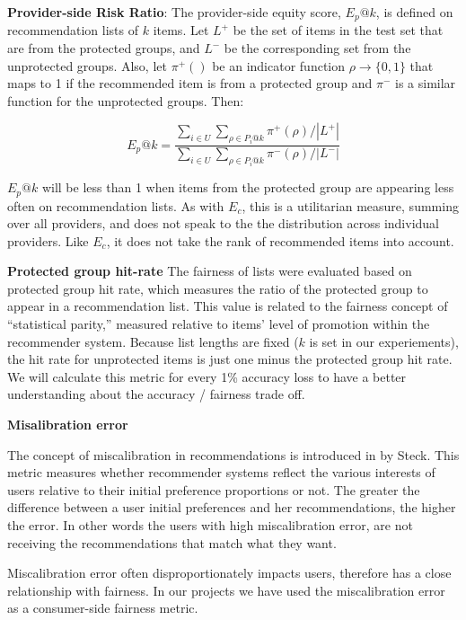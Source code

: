        
        \textbf{Provider-side Risk Ratio}: The provider-side equity score, $E_p@k$, is defined on recommendation lists of $k$ items. Let $L^+$ be the set of items in the test set that are from the protected groups, and $L^-$ be the corresponding set from the unprotected groups. Also, let $\pi^+()$ be an indicator function $\rho \rightarrow \{0,1\}$ that maps to 1 if the recommended item is from a protected group and $\pi^-$ is a similar function for the unprotected groups. Then:

        \begin{equation}
        E_p@k=\frac{\sum_{i \in U}{\sum_{\rho \in P_i@k}{\pi^+(\rho)}}/|L^+|}
        {\sum_{i \in U}{\sum_{\rho \in P_i@k}{\pi^-(\rho)}}/|L^-|}
        \end{equation}
        
        $E_p@k$ will be less than 1 when items from the protected group are appearing less often on recommendation lists. As with $E_c$, this is a utilitarian measure, summing over all providers, and does not speak to the the distribution across individual providers. Like $E_c$, it does not take the rank of recommended items into account.


        \textbf{Protected group hit-rate}
        The fairness of lists were evaluated based on protected group hit rate, which measures the ratio of the protected group to appear in a recommendation list. This value is related to the fairness concept of ``statistical parity,'' measured relative to items' level of promotion within the recommender system. Because list lengths are fixed ($k$ is set in our experiements), the hit rate for unprotected items is just one minus the protected group hit rate. We will calculate this metric for every 1\% accuracy loss to have a better understanding about the accuracy / fairness trade off.
        
    
        \textbf{Misalibration error}
        
        The concept of miscalibration in recommendations is introduced in \cite{steck2018calibrated} by Steck. This metric measures whether recommender systems reflect the various interests of users relative to their initial preference proportions or not. The greater the difference between a user initial preferences and her recommendations, the higher the error. In other words the users with high miscalibration error, are not receiving the recommendations that match what they want.
        
        Miscalibration error often disproportionately impacts users, therefore has a close relationship with fairness. In our projects we have used the miscalibration error as a consumer-side fairness metric.
        
